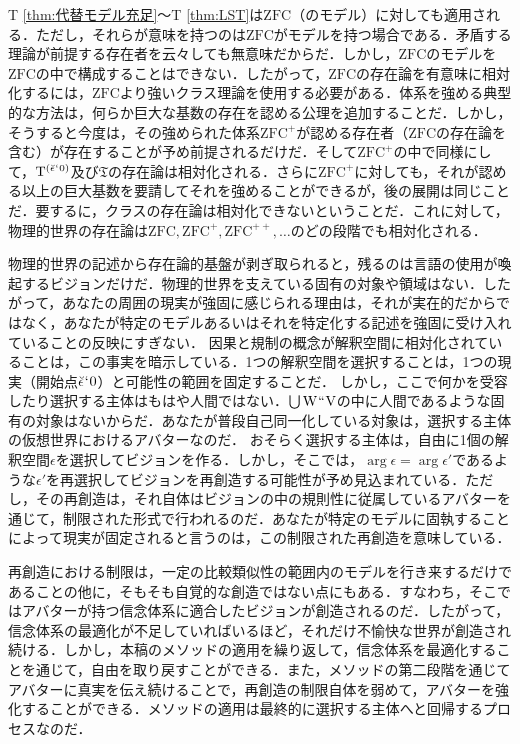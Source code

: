 T \ref{thm:代替モデル充足}〜T \ref{thm:LST}は$\mathrm{ZFC}$（のモデル）に対しても適用される．ただし，それらが意味を持つのは$\mathrm{ZFC}$がモデルを持つ場合である．矛盾する理論が前提する存在者を云々しても無意味だからだ．しかし，$\mathrm{ZFC}$のモデルを$\mathrm{ZFC}$の中で構成することはできない．したがって，$\mathrm{ZFC}$の存在論を有意味に相対化するには，$\mathrm{ZFC}$より強いクラス理論を使用する必要がある．体系を強める典型的な方法は，何らか巨大な基数の存在を認める公理を追加することだ．しかし，そうすると今度は，その強められた体系$\mathrm{ZFC}^{+}$が認める存在者（$\mathrm{ZFC}$の存在論を含む）が存在することが予め前提されるだけだ．そして$\mathrm{ZFC}^{+}$の中で同様にして，$\mathrm{T}^{(\breve{\epsilon}{\mspace{1mu}{`}\mspace{1mu}} 0)}$及び$\mathfrak{T}$の存在論は相対化される．さらに$\mathrm{ZFC}^{+}$に対しても，それが認める以上の巨大基数を要請してそれを強めることができるが，後の展開は同じことだ．要するに，クラスの存在論は相対化できないということだ．これに対して，物理的世界の存在論は$ \mathrm{ZFC},\mathrm{ZFC}^{+},\mathrm{ZFC}^{++},\dots $のどの段階でも相対化される．

物理的世界の記述から存在論的基盤が剥ぎ取られると，残るのは言語の使用が喚起するビジョンだけだ．物理的世界を支えている固有の対象や領域はない．したがって，あなたの周囲の現実が強固に感じられる理由は，それが実在的だからではなく，あなたが特定のモデルあるいはそれを特定化する記述を強固に受け入れていることの反映にすぎない．
因果と規制の概念が解釈空間に相対化されていることは，この事実を暗示している．1つの解釈空間を選択することは，1つの現実（開始点$ \breve{\epsilon}{\mspace{1mu}{`}\mspace{1mu}} 0 $）と可能性の範囲を固定することだ．
しかし，ここで何かを受容したり選択する主体はもはや人間ではない．${\textstyle\bigcup}\mspace{3mu}\mathrm{W}{\mspace{1mu}{``}\mspace{1mu}}\mathrm{V}$の中に人間であるような固有の対象はないからだ．あなたが普段自己同一化している対象は，選択する主体の仮想世界におけるアバターなのだ．
おそらく選択する主体は，自由に1個の解釈空間$\epsilon$を選択してビジョンを作る．しかし，そこでは，$ \arg\epsilon = \arg \epsilon' $であるような$\epsilon'$を再選択してビジョンを再創造する可能性が予め見込まれている．ただし，その再創造は，それ自体はビジョンの中の規則性に従属しているアバターを通じて，制限された形式で行われるのだ．あなたが特定のモデルに固執することによって現実が固定されると言うのは，この制限された再創造を意味している．

再創造における制限は，一定の比較類似性の範囲内のモデルを行き来するだけであることの他に，そもそも自覚的な創造ではない点にもある．すなわち，そこではアバターが持つ信念体系に適合したビジョンが創造されるのだ．したがって，信念体系の最適化が不足していればいるほど，それだけ不愉快な世界が創造され続ける．しかし，本稿のメソッドの適用を繰り返して，信念体系を最適化することを通じて，自由を取り戻すことができる．また，メソッドの第二段階を通じてアバターに真実を伝え続けることで，再創造の制限自体を弱めて，アバターを強化することができる．メソッドの適用は最終的に選択する主体へと回帰するプロセスなのだ．

